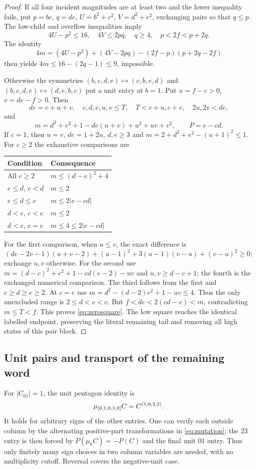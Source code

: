 \begin{proof}
If all four incident magnitudes are at least two and the lower inequality fails, put $p=bc$, $q=de$, $U=b^2+c^2$, $V=d^2+e^2$, exchanging pairs so that $q\le p$. The low-child and overflow inequalities imply
\[
 4U-p^2\le16,\quad4V\le2pq,\quad q\ge4,\quad p<2f<p+2q.
\]
The identity
\[
 4m=(4U-p^2)+(4V-2pq)-(2f-p)(p+2q-2f)
\]
then yields $4m\le16-(2q-1)\le9$, impossible.

Otherwise the symmetries $(b,c,d,e)\mapsto(c,b,e,d)$ and $(b,c,d,e)\mapsto(d,e,b,c)$ put a unit entry at $b=1$. Put $u=f-c>0$, $v=de-f>0$. Then
\[
 de=c+u+v,\quad c,d,e,u,v\le T,\quad T<c+u,c+v,\quad2u,2v<de,
\]
and
\begin{equation}\label{eq:zeroM}
 m=d^2+e^2+1-de(u+v)+u^2+uv+v^2,\qquad P=e-cd.
\end{equation}
If $c=1$, then $u=v$, $de=1+2u$, $d,e\ge3$ and $m=2+d^2+e^2-(u+1)^2\le1$. For $c\ge2$ the exhaustive comparisons are
\begin{center}\begin{tabular}{ll}\toprule
Condition & Consequence\\\midrule
All $c\ge2$ & $m\le(d-e)^2+4$\\
$e\le d$, $c<d$ & $m\le2$\\
$e\le d\le c$ & $m\le2|e-cd|$\\
$d<e$, $c<e$ & $m\le2$\\
$d<e$, $c=e$ & $m\le4\le2|e-cd|$\\\bottomrule
\end{tabular}\end{center}
For the first comparison, when $u\le v$, the exact difference is
\[
 (de-2v-1)(u+v-2)+(u-1)^2+3(u-1)(v-u)+(v-u)^2\ge0;
\]
exchange $u,v$ otherwise. For the second use
$m=(d-c)^2+e^2+1-cd(e-2)-uv$ and $u,v\ge d-c+1$; the fourth is the exchanged numerical comparison. The third follows from the first and $c\ge d\ge e\ge2$. At $c=e$ use $m=d^2-(d-2)e^2+1-uv\le4$. Thus the only unexcluded range is $2\le d<e<c$. But $f<de<2(cd-e)<m$, contradicting $m\le T<f$. This proves \eqref{eq:zerosquare}. The low square reaches the identical labelled endpoint, preserving the literal remaining tail and removing all high states of this pair block.
\end{proof}

\subsection{Unit pairs and transport of the remaining word}\label{app:unit}
For $|C_{01}|=1$, the unit pentagon identity is
\begin{equation}\label{eq:pentagon}
 \mu_{[0,1,0,1,0]}C=C^{(1,0,2,3)}.
\end{equation}
It holds for arbitrary signs of the other entries. One can verify each outside column by the alternating positive-part transformations in \eqref{eq:mutation}; the $23$ entry is then forced by $P(\mu_kC)=-P(C)$ and the final unit $01$ entry. Thus only finitely many sign choices in two column variables are needed, with no multiplicity cutoff. Reversal covers the negative-unit case.

